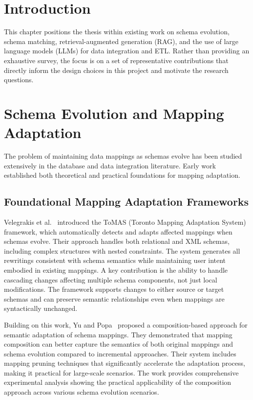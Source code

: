 
\section{Introduction}
\label{sec:related-intro}

This chapter positions the thesis within existing work on schema evolution, schema matching, retrieval-augmented generation (RAG), and the use of large language models (LLMs) for data integration and ETL. Rather than providing an exhaustive survey, the focus is on a set of representative contributions that directly inform the design choices in this project and motivate the research questions.


\section{Schema Evolution and Mapping Adaptation}
\label{sec:related-schema-evolution}

The problem of maintaining data mappings as schemas evolve has been studied extensively in the database and data integration literature. Early work established both theoretical and practical foundations for mapping adaptation.

\subsection{Foundational Mapping Adaptation Frameworks}

Velegrakis et al.~\cite{velegrakis2003mapping} introduced the ToMAS (Toronto Mapping Adaptation System) framework, which automatically detects and adapts affected mappings when schemas evolve. Their approach handles both relational and XML schemas, including complex structures with nested constraints. The system generates all rewritings consistent with schema semantics while maintaining user intent embodied in existing mappings. A key contribution is the ability to handle cascading changes affecting multiple schema components, not just local modifications. The framework supports changes to either source or target schemas and can preserve semantic relationships even when mappings are syntactically unchanged.

Building on this work, Yu and Popa~\cite{yu2005semantic} proposed a composition-based approach for semantic adaptation of schema mappings. They demonstrated that mapping composition can better capture the semantics of both original mappings and schema evolution compared to incremental approaches. Their system includes mapping pruning techniques that significantly accelerate the adaptation process, making it practical for large-scale scenarios. The work provides comprehensive experimental analysis showing the practical applicability of the composition approach across various schema evolution scenarios.


